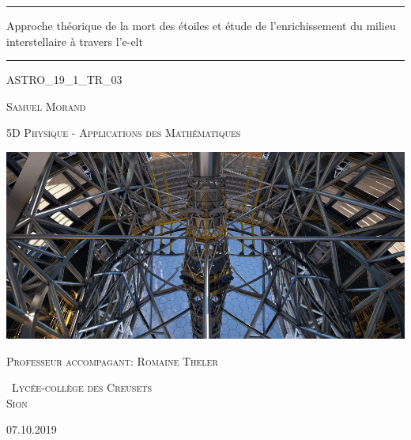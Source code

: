 \documentclass[11pt,a4paper,twoside]{report}
\begin{document}
\begin{titlepage} 
	
	\centering 
	
	\scshape 
	
	\vspace*{\baselineskip}
	
	\rule{\textwidth}{0.4pt} 
	
	\vspace{0.75\baselineskip} 
	
	{\LARGE Approche théorique de la mort des étoiles et étude de l'enrichissement du milieu interstellaire à travers l'e-elt} 
	
	\vspace{0.75\baselineskip} 
	
	\rule{\textwidth}{0.4pt}\vspace*{-\baselineskip}\vspace{3.2pt} 
	
	\vspace{2.5\baselineskip} 
	
	ASTRO\_19\_1\_TR\_03
	
	\vspace*{2.5\baselineskip} 
	
	{\scshape\Large Samuel Morand \\}
	
	\vspace{0.75\baselineskip} 

	{\scshape\Large 5D Physique - Applications des Mathématiques\\}

	\vspace*{4\baselineskip}
	
	\includegraphics[scale=1]{images/e-elt}

	\vspace*{4\baselineskip}
	
	{\scshape\Large Professeur accompagant: Romaine Theler\\}
	
	\vspace*{3\baselineskip}
	
	{\scshape\ Lycée-collège des Creusets \\ Sion} 
	
	\vfill 
	
	07.10.2019

\end{titlepage}
\end{document}
